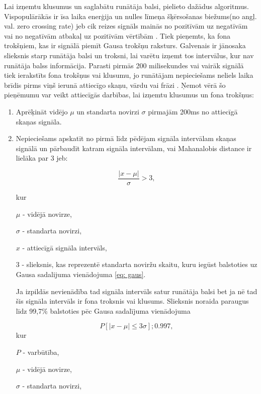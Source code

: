\documentclass[12pt,paper=A4]{report}
\begin{document}
Lai izņemtu klusumus un saglabātu runātāja balsi, pielieto dažādus algoritmus. Vispopulārākās ir īsa laika enerģija un nulles līmeņa šķērsošanas biežums(no angļ. val. zero crossing rate) jeb cik reizes signāls mainās no pozitīvām uz negatīvām vai no negatīvām atbakaļ uz pozitīvām vērtībām \cite{zerocross}. Tiek pieņemts, ka fona trokšņiem, kas ir signālā piemīt Gausa trokšņu raksturs. Galvenais ir jānosaka slieksnis starp runātāja balsi un troksni, lai varētu izņemt tos intervālus, kur nav runātāja balss informācija.
Parasti pirmās 200 milisekundes vai vairāk signālā tiek ierakstīts fona trokšņus vai klusumu, jo runātājam nepieciešams neliels laika brīdis pirms viņš ierunā attiecīgo skaņu, vārdu vai frāzi \cite{noise1}.
Ņemot vērā šo pieņēmumu var veikt attiecīgās darbības, lai izņemtu klusumus un fona trokšņus: 
\begin{enumerate}

\item Aprēķināt vidējo $\mu$ un standarta novirzi $\sigma$ pirmajām 200ms no attiecīgā skaņas signāla.

\item Nepieciešams apskatīt no pirmā līdz pēdējam signāla intervālam skaņas signālā un pārbaudīt katram signāla intervālam, vai Mahanalobis distance ir lielāka par 3 jeb: 

\begin{equation}
\frac{|x-\mu|}{\sigma}>3,
\end{equation}

kur

$\mu$ - vidējā novirze,

$\sigma$ - standarta novirzi,

$x$ - attiecīgā signāla intervāls,

$3$ - slieksnis, kas reprezentē standarta noviržu skaitu, kuru iegūst balstoties uz Gausa sadalijuma vienādojuma \ref{eq: gaus}.

Ja izpildās nevienādība tad signāla intervāls satur runātāja balsi bet ja nē tad šis signāla intervāls ir fona troksnis vai klusums. Slieksnis noraida paraugus līdz 99,7\% balstoties pēc Gausa sadalījuma vienādojuma

\begin{equation}\label{eq: gaus}
P[|x−\mu|\leq3\sigma];0.997,
\end{equation}
kur 

$P$ - varbūtība,

$\mu$ - vidējā novirze,

$\sigma$ - standarta novirzi,


\end{enumerate}
\end{document}
